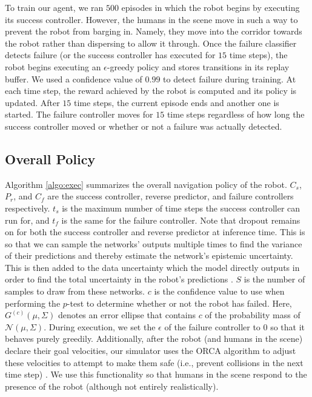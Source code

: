 \documentclass[letterpaper, 10 pt, conference]{ieeeconf}  %
\begin{document}
		To train our agent, we ran $500$ episodes in which the robot begins by executing its success controller. However, the humans in the scene move in such a way to prevent the robot from barging in. Namely, they move into the corridor towards the robot rather than dispersing to allow it through. Once the failure classifier detects failure (or the success controller has executed for $15$ time steps), the robot begins executing an $\epsilon$-greedy policy and stores transitions in its replay buffer. We used a confidence value of $0.99$ to detect failure during training. At each time step, the reward achieved by the robot is computed and its policy is updated. After $15$ time steps, the current episode ends and another one is started. The failure controller moves for $15$ time steps regardless of how long the success controller moved or whether or not a failure was actually detected. 
		
	\subsection{Overall Policy}
		Algorithm \ref{algo:exec} summarizes the overall navigation policy of the robot. $C_s$, $P_r$, and $C_f$ are the success controller, reverse predictor, and failure controllers respectively. $t_s$ is the maximum number of time steps the success controller can run for, and $t_f$ is the same for the failure controller. Note that dropout remains on for both the success controller and reverse predictor at inference time. This is so that we can sample the networks' outputs multiple times to find the variance of their predictions and thereby estimate the network's epistemic uncertainty. This is then added to the data uncertainty which the model directly outputs in order to find the total uncertainty in the robot's predictions \cite{gal2016uncertainty}. $S$ is the number of samples to draw from these networks. $c$ is the confidence value to use when performing the $p$-test to determine whether or not the robot has failed. Here, $G^{(c)}(\mu, \Sigma)$ denotes an error ellipse that contains $c$ of the probability mass of $\mathcal{N}(\mu, \Sigma)$. During execution, we set the $\epsilon$ of the failure controller to $0$ so that it behaves purely greedily. Additionally, after the robot (and humans in the scene) declare their goal velocities, our simulator uses the ORCA algorithm to adjust these velocities to attempt to make them safe (i.e., prevent collisions in the next time step) \cite{orca}. We use this functionality so that humans in the scene respond to the presence of the robot (although not entirely realistically).
		
\end{document}
